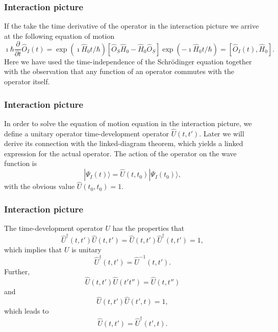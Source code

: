 \frame
{
\frametitle{Interaction picture}
\begin{small}
{\scriptsize
If the take the time derivative of the operator in the interaction picture we arrive at the following equation of motion
\[
\imath \hbar\frac{\partial }{\partial t}\hat{O}_I(t) = \exp{(\imath\hat{H}_0t/\hbar)}\left[\hat{O}_S\hat{H}_0-\hat{H}_0\hat{O}_S\right]\exp{(-\imath\hat{H}_0t/\hbar)}=\left[\hat{O}_I(t),\hat{H}_0\right].
\]
Here we have used the time-independence of the Schr\"odinger equation
together with the observation that any function of an operator commutes with the operator itself. 
}
\end{small}
}
\frame
{
\frametitle{Interaction picture}
\begin{small}
{\scriptsize
In order to solve the equation of motion equation in the interaction picture, we define a unitary operator
time-development operator $\hat{U}(t,t')$. Later we will derive its
connection with the linked-diagram theorem, which yields a
linked expression for the actual operator. 
The action of the operator on the wave function is
\[
|\Psi_I(t) \rangle = \hat{U}(t,t_0)|\Psi_I(t_0)\rangle,
\]
with the obvious value $\hat{U}(t_0,t_0)=1$.
}
\end{small}
}
\frame
{
\frametitle{Interaction picture}
\begin{small}
{\scriptsize
The time-development operator $U$ has the
properties that
\[
     \hat{U}^{\dagger}(t,t')\hat{U}(t,t')=\hat{U}(t,t')\hat{U}^{\dagger}(t,t')=1,
\]
which implies that $U$ is unitary
\[
     \hat{U}^{\dagger}(t,t')=\hat{U}^{-1}(t,t').
\]
Further,
\[
    \hat{U}(t,t')\hat{U}(t't'')=\hat{U}(t,t'')
\]
and
\[
    \hat{U}(t,t')\hat{U}(t',t)=1,
\]
which leads to
\[
    \hat{U}(t,t')=\hat{U}^{\dagger}(t',t).
\]
}
\end{small}
}


